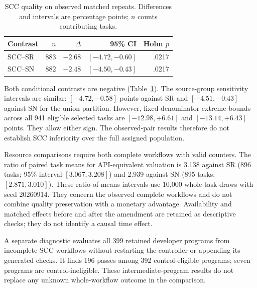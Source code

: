 \begin{table}[t]
\caption{SCC quality on observed matched repeats. Differences and intervals are percentage points; $n$ counts contributing tasks.}
\label{tab:scc-quality}
\centering\small
\begin{tabular}{@{}lrrrr@{}}
\toprule
Contrast & $n$ & $\Delta$ & 95\% CI & Holm $p$\\
\midrule
SCC--SR & 883 & $-2.68$ & $[-4.72,-0.60]$ & .0217\\
SCC--SN & 882 & $-2.48$ & $[-4.50,-0.43]$ & .0217\\
\bottomrule
\end{tabular}
\end{table}

Both conditional contrasts are negative (Table~\ref{tab:scc-quality}). The source-group sensitivity intervals are similar: $[-4.72,-0.58]$ points against SR and $[-4.51,-0.43]$ against SN for the union partition. However, fixed-denominator extreme bounds across all 941 eligible selected tasks are $[-12.98,+6.61]$ and $[-13.14,+6.43]$ points. They allow either sign. The observed-pair results therefore do not establish SCC inferiority over the full assigned population.

Resource comparisons require both complete workflows with valid counters. The ratio of paired task means for API-equivalent valuation is 3.138 against SR (896 tasks; 95\% interval $[3.067,3.208]$) and 2.939 against SN (895 tasks; $[2.871,3.010]$). These ratio-of-means intervals use 10,000 whole-task draws with seed 20260914. They concern the observed complete workflows and do not combine quality preservation with a monetary advantage. Availability and matched effects before and after the amendment are retained as descriptive checks; they do not identify a causal time effect.

A separate diagnostic evaluates all 399 retained developer programs from incomplete SCC workflows without restarting the controller or appending its generated checks. It finds 196 passes among 392 control-eligible programs; seven programs are control-ineligible. These intermediate-program results do not replace any unknown whole-workflow outcome in the comparison.
